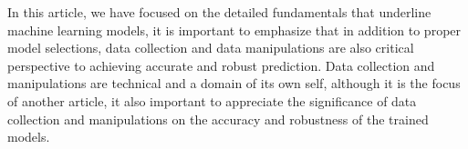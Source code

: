 
\par
In this article, we have focused on the detailed fundamentals that underline machine learning models, it is important to emphasize that in addition to proper model selections, data collection and data manipulations are also critical perspective to achieving accurate and robust prediction. Data collection and manipulations are technical and  a domain of its own self, although it is the focus of another article, it also important to appreciate the significance of data collection and manipulations on the accuracy and robustness of the trained models.
\par 
